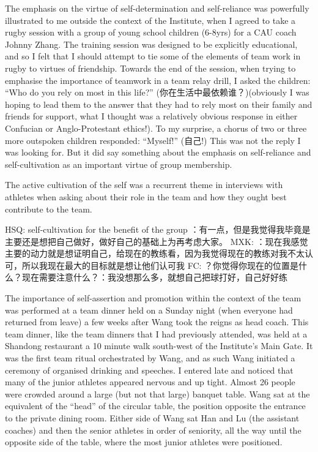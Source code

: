   The emphasis on the virtue of self-determination and self-reliance was powerfully illustrated to me outside the context of the Institute, when I agreed to take a rugby session with a group of young school children (6-8yrs) for a CAU coach Johnny Zhang.  The training session was designed to be explicitly educational, and so I felt that I should attempt to tie some of the elements of team work in rugby to virtues of friendship.  Towards the end of the session, when trying to emphasise the importance of teamwork in a team relay drill, I asked the children: ``Who do you rely on most in this life?'' (你在生活中最依赖谁？)(obviously I was hoping to lead them to the answer that they had to rely most on their family and friends for support, what I thought was a relatively obvious response in either Confucian or Anglo-Protestant ethics!).  To my surprise, a chorus of two or three more outspoken children responded: ``Myself!'' (自己!) This was not the reply I was looking for. But it did say something about the emphasis on self-reliance and self-cultivation as an important virtue of group membership.



  The active cultivation of the self was a recurrent theme in interviews with athletes when asking about their role in the team and how they ought best contribute to the team.

  HSQ: self-cultivation for the benefit of the group
  ：有一点，但是我觉得我毕竟是主要还是想把自己做好，做好自己的基础上为再考虑大家。
  MXK:
  ：现在我感觉主要的动力就是想证明自己，给现在的教练看，因为我觉得现在的教练对我不太认可，所以我现在最大的目标就是想让他们认可我
  FC:
  ？你觉得你现在的位置是什么？现在需要注意什么？：我没想那么多，就想自己把球打好，自己好好练


  The importance of self-assertion and promotion within the context of the team was performed at a team dinner held on a Sunday night (when everyone had returned from leave) a few weeks after Wang took the reigns as head coach.  This team dinner, like the team dinners that I had previously attended, was held at a Shandong restaurant a 10 minute walk south-west of the Institute's Main Gate.  It was the first team ritual orchestrated by Wang, and as such Wang initiated a ceremony of organised drinking and speeches.  I entered late and noticed that many of the junior athletes appeared nervous and up tight. Almost 26 people were crowded around a large (but not that large) banquet table.  Wang sat at the equivalent of the ``head'' of the circular table, the position opposite the entrance to the private dining room.  Either side of Wang sat Han and Lu (the assistant coaches) and then the senior athletes in order of seniority, all the way until the opposite side of the table, where the most junior athletes were positioned.

